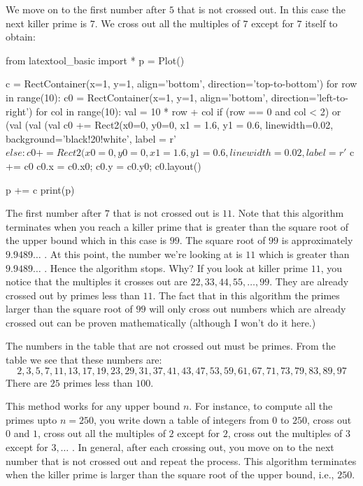 We move on to the first number after $5$ that is not crossed out. In this
case the next killer prime is $7$. We cross out all the multiples of $7$
except for $7$ itself to obtain:

\begin{python}
from latextool_basic import *
p = Plot()

c = RectContainer(x=1, y=1, align='bottom', direction='top-to-bottom')
for row in range(10):
    c0 = RectContainer(x=1, y=1, align='bottom', direction='left-to-right')
    for col in range(10):
        val = 10 * row + col
        if (row == 0 and col < 2) or (val %
           (val %
           (val %
            c0 += Rect2(x0=0, y0=0, x1 = 1.6, y1 = 0.6, linewidth=0.02,
                        background='black!20!white', 
                        label = r'$%
        else:
            c0 += Rect2(x0=0, y0=0, x1 = 1.6, y1 = 0.6, linewidth=0.02, 
                        label = r'$%
    c += c0
    c0.x = c0.x0; c0.y = c0.y0; c0.layout()

p += c
print(p)
\end{python}

The first number after $7$ that is not crossed out is $11$. Note that this
algorithm terminates when you reach a killer prime that is greater than the
square root of the upper bound which in this case is $99$. The square root
of $99$ is approximately $9.9489\dots$ . At this point, the number we're
looking at is $11$ which is greater than $9.9489\dots$ . Hence the algorithm
stops. Why? If you look at killer prime $11$, you notice that the multiples
it crosses out are $22, 33, 44, 55, \dots, 99$. They are already crossed out
by primes less than $11$. The fact that in this algorithm the primes larger
than the square root of $99$ will only cross out numbers which are already
crossed out can be proven mathematically (although I won't do it here.)

The numbers in the table that are not crossed out must be primes. From the
table we see that these numbers are:
\[
2, 3, 5, 7, 11, 13, 17, 19, 23, 29, 31, 37, 41, 43, 47, 53, 59, 61, 67, 71,
73, 79, 83, 89, 97
\]
There are $25$ primes less than $100$.

This method works for any upper bound $n$. For instance, to compute all the
primes upto $n = 250$,  you write down a table of integers from $0$ to $250$,
cross out $0$ and $1$, cross out all the multiples of $2$ except for $2$,
cross out the multiples of $3$ except for $3, \dots$ . In general, after each
crossing out, you move on to the next number that is not crossed out and
repeat the process. This algorithm terminates when the killer prime is larger
than the square root of the upper bound, i.e., $250$.

